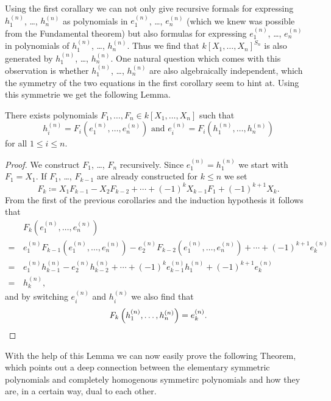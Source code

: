 Using the first corallary we can not only give recursive formals for expressing $h^{(n)}_1$, \dots, $h^{(n)}_n$ as polynomials in $e^{(n)}_1$, \dots, $e^{(n)}_n$ (which we knew was possible from the Fundamental theorem) but also formulas for expressing $e^{(n)}_1$, \dots, $e^{(n)}_n$ in polynomials of $h^{(n)}_1$, \dots, $h^{(n)}_n$.
Thus we find that $k[X_1, \dotsc, X_n]^{S_n}$ is also generated by $h^{(n)}_1$, \dots, $h^{(n)}_n$.
One natural question which comes with this observation is whether $h^{(n)}_1$, \dots, $h^{(n)}_n$ are also algebraically independent, which the symmetry of the two equations in the first corollary seem to hint at.
Using this symmetrie we get the following Lemma.


\begin{lem}
  There exists polynomials $F_1, \dotsc, F_n \in k[X_1, \dotsc, X_n]$ such that
  \[
      h^{(n)}_i
    = F_i\left(e^{(n)}_1, \dotsc, e^{(n)}_n\right)
    \text{ and }
      e^{(n)}_i
    = F_i\left(h^{(n)}_1, \dotsc, h^{(n)}_n\right)
  \]
  for all $1 \leq i \leq n$.
\end{lem}
\begin{proof}
  We construct $F_1$, \dots, $F_n$ recursively.
  Since $e^{(n)}_1 = h^{(n)}_1$ we start with $F_1 = X_1$.
  If $F_1$, \dots, $F_{k-1}$ are already constructed for $k \leq n$ we set
  \[
              F_k
    \coloneqq   X_1 F_{k-1}
              - X_2 F_{k-2}
              + \dotsb
              + (-1)^k X_{k-1} F_1
              + (-1)^{k+1} X_k.
  \]
  From the first of the previous corollaries and the induction hypothesis it follows that
  \begin{align*}
     &\,  F_k\left(e^{(n)}_1, \dotsc, e^{(n)}_n\right) \\
    =&\,    e^{(n)}_1 F_{k-1}\left( e^{(n)}_1, \dotsc, e^{(n)}_n \right)
          - e^{(n)}_2 F_{k-2}\left( e^{(n)}_1, \dotsc, e^{(n)}_n \right)
          + \dotsb
          + (-1)^{k+1} e^{(n)}_k \\
    =&\,    e^{(n)}_1 h^{(n)}_{k-1}
          - e^{(n)}_2 h^{(n)}_{k-2}
          + \dotsb
          + (-1)^k e^{(n)}_{k-1} h^{(n)}_1
          + (-1)^{k+1} e^{(n)}_k \\
    =&\,  h^{(n)}_k,
  \end{align*}
  and by switching $e^{(n)}_i$ and $h^{(n)}_i$ we also find that
  \[
      F_k\left(h^{(n)}_1, \dotsc, h^{(n)}_n\right)
    = e^{(n)}_k.
    \qedhere
  \]
\end{proof}


With the help of this Lemma we can now easily prove the following Theorem, which points out a deep connection between the elementary symmetric polynomials and completely homogenous symmetirc polynomials and how they are, in a certain way, dual to each other.


